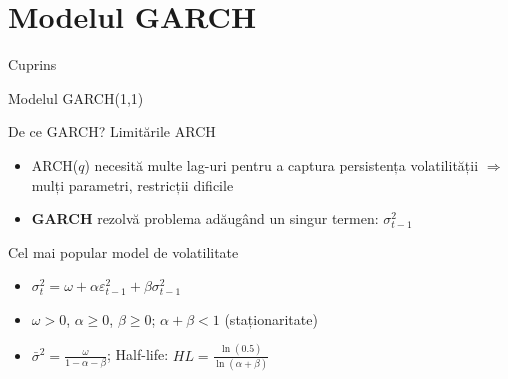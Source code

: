 \documentclass[9pt, aspectratio=169, t]{beamer}
\begin{document}
\section{Modelul GARCH}

\begin{frame}{Cuprins}
    \small
    \vspace{-0.2cm}
    \tableofcontents[currentsection]
\end{frame}

\begin{frame}{Modelul GARCH(1,1)}
    \small
    \vspace{-0.2cm}
        \begin{alertblock}{De ce GARCH? Limitările ARCH}
            \begin{itemize}
                \item ARCH($q$) necesită multe lag-uri pentru a captura persistența volatilității $\Rightarrow$ mulți parametri, restricții dificile
                \item \textbf{GARCH} rezolvă problema adăugând un singur termen: $\sigma_{t-1}^2$
            \end{itemize}
        \end{alertblock}
        \vspace{-0.1cm}
        \begin{block}{Cel mai popular model de volatilitate}
            \begin{itemize}
                \item $\sigma_t^2 = \omega + \alpha \varepsilon_{t-1}^2 + \beta \sigma_{t-1}^2$
            \end{itemize}
        \end{block}
        \vspace{-0.1cm}
        \begin{prop}
            \begin{itemize}
                \item $\omega > 0$, $\alpha \geq 0$, $\beta \geq 0$; \quad $\alpha + \beta < 1$ (staționaritate)
                \item $\bar{\sigma}^2 = \frac{\omega}{1 - \alpha - \beta}$; \quad Half-life: $HL = \frac{\ln(0.5)}{\ln(\alpha + \beta)}$
            \end{itemize}
        \end{prop}
\end{frame}
\end{document}
